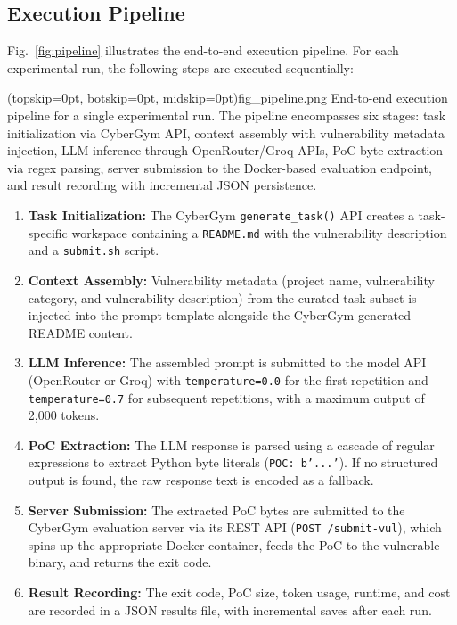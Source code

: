\documentclass{ieeeaccess}
\begin{document}
\subsection{Execution Pipeline}

Fig.~\ref{fig:pipeline} illustrates the end-to-end execution pipeline. For each experimental run, the following steps are executed sequentially:

\Figure[t!](topskip=0pt, botskip=0pt, midskip=0pt){fig_pipeline.png}
{End-to-end execution pipeline for a single experimental run. The pipeline encompasses six stages: task initialization via CyberGym API, context assembly with vulnerability metadata injection, LLM inference through OpenRouter/Groq APIs, PoC byte extraction via regex parsing, server submission to the Docker-based evaluation endpoint, and result recording with incremental JSON persistence.\label{fig:pipeline}}

\begin{enumerate}
    \item \textbf{Task Initialization:} The CyberGym \texttt{generate\_task()} API creates a task-specific workspace containing a \texttt{README.md} with the vulnerability description and a \texttt{submit.sh} script.
    
    \item \textbf{Context Assembly:} Vulnerability metadata (project name, vulnerability category, and vulnerability description) from the curated task subset is injected into the prompt template alongside the CyberGym-generated README content.
    
    \item \textbf{LLM Inference:} The assembled prompt is submitted to the model API (OpenRouter or Groq) with \texttt{temperature=0.0} for the first repetition and \texttt{temperature=0.7} for subsequent repetitions, with a maximum output of 2,000 tokens.
    
    \item \textbf{PoC Extraction:} The LLM response is parsed using a cascade of regular expressions to extract Python byte literals (\texttt{POC: b'...'}). If no structured output is found, the raw response text is encoded as a fallback.
    
    \item \textbf{Server Submission:} The extracted PoC bytes are submitted to the CyberGym evaluation server via its REST API (\texttt{POST /submit-vul}), which spins up the appropriate Docker container, feeds the PoC to the vulnerable binary, and returns the exit code.
    
    \item \textbf{Result Recording:} The exit code, PoC size, token usage, runtime, and cost are recorded in a JSON results file, with incremental saves after each run.
\end{enumerate}
\end{document}
